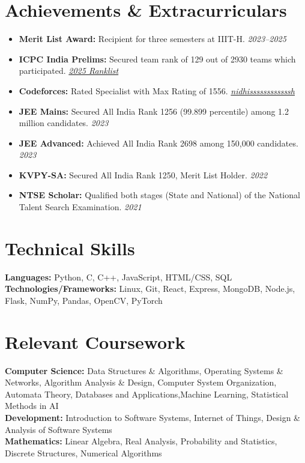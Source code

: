 \documentclass[letterpaper,11pt]{article}
\newcommand{\resumeItem}[1]{
  \item\small{
    {#1 \vspace{-2pt}}
  }
}
\newcommand{\resumeItemListStart}{\begin{itemize}[leftmargin=0.15in, topsep=2pt, partopsep=0pt, parsep=0pt, itemsep=2pt]}
\newcommand{\resumeItemListEnd}{\end{itemize}\vspace{-5pt}}
\begin{document}
\section{Achievements \& Extracurriculars}
\resumeItemListStart

\resumeItem{\textbf{Merit List Award:} Recipient for three semesters at IIIT-H. \hfill \textit{2023--2025}}

\resumeItem{\textbf{ICPC India Prelims:} Secured team rank of 129 out of 2930 teams which participated.
\hfill \href{https://indiaicpc.in/ranklist.html}{\textit{2025 Ranklist}}}

\resumeItem{\textbf{Codeforces:} Rated Specialist with Max Rating of 1556.
\hfill \href{https://codeforces.com/profile/nidhissssssssssssh}{\textit{nidhissssssssssssh}}}
 
\resumeItem{\textbf{JEE Mains:} Secured All India Rank 1256 (99.899 percentile) among 1.2 million candidates.
\hfill \textit{2023}}

\resumeItem{\textbf{JEE Advanced:} Achieved All India Rank 2698 among 150,000 candidates.
\hfill \textit{2023}}

\resumeItem{\textbf{KVPY-SA:} Secured All India Rank 1250, Merit List Holder.
\hfill \textit{2022}}

\resumeItem{\textbf{NTSE Scholar:} Qualified both stages (State and National) of the National Talent Search Examination.
\hfill \textit{2021}}


\resumeItemListEnd

\section{Technical Skills}
\small{
\textbf{Languages:} Python, C, C++, JavaScript, HTML/CSS, SQL\\
    \textbf{Technologies/Frameworks:} Linux, Git, React, Express, MongoDB, Node.js, Flask, NumPy, Pandas, OpenCV, PyTorch\\
}
\vspace{-5pt}
\section{Relevant Coursework}
\small{
\textbf{Computer Science:} Data Structures \& Algorithms, Operating Systems \& Networks, Algorithm Analysis \& Design, Computer System Organization, Automata Theory, Databases and Applications,Machine Learning, Statistical Methods in AI \\
\textbf{Development:} Introduction to Software Systems, Internet of Things, Design \& Analysis of Software Systems \\
\textbf{Mathematics:} Linear Algebra, Real Analysis, Probability and Statistics, Discrete Structures, Numerical Algorithms
}
\end{document}
